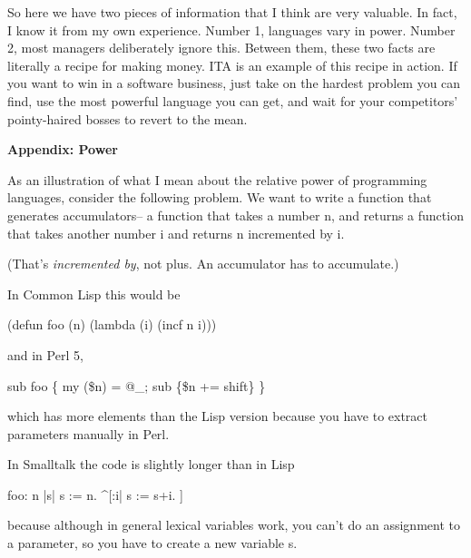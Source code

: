                   So here we have two pieces of information that I think are
                  very valuable. In fact, I know it from my own experience.
                  Number 1, languages vary in power. Number 2, most managers
                  deliberately ignore this. Between them, these two facts are
                  literally a recipe for making money. ITA is an example of this
                  recipe in action. If you want to win in a software business,
                  just take on the hardest problem you can find, use the most
                  powerful language you can get, and wait for your competitors'
                  pointy-haired bosses to revert to the mean.


                  
                  




                  \textbf{Appendix: Power}

As an illustration of what I
                  mean about the relative power of programming languages,
                  consider the following problem. We want to write a function
                  that generates accumulators-- a function that takes a number
                  n, and returns a function that takes another number i and
                  returns n incremented by i.

(That's
                  \emph{incremented by}, not plus. An accumulator has to
                  accumulate.)

In Common Lisp this would be
                  
                    
(defun foo (n)
  (lambda (i) (incf n i)))

                  
                  and in Perl 5,
                  
                    
sub foo \{  
  my (\$n) = @\_;
  sub \{\$n += shift\}
\}

                  
                  which has more elements than the Lisp version because you have
                  to extract parameters manually in Perl.

In
                  Smalltalk the code is slightly longer than in Lisp
                  
                    
foo: n                              
  |s|                      
  s := n.                          
  \textasciicircum{}[:i| s := s+i. ] 

                  
                  because although in general lexical variables work, you can't
                  do an assignment to a parameter, so you have to create a new
                  variable s.

